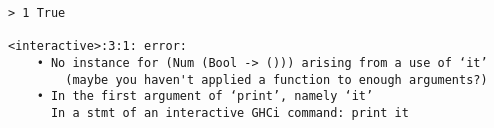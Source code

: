 \begin{repl}\begin{lstlisting}
> 1 True

<interactive>:3:1: error:
    • No instance for (Num (Bool -> ())) arising from a use of ‘it’
        (maybe you haven't applied a function to enough arguments?)
    • In the first argument of ‘print’, namely ‘it’
      In a stmt of an interactive GHCi command: print it\end{lstlisting}\end{repl}
